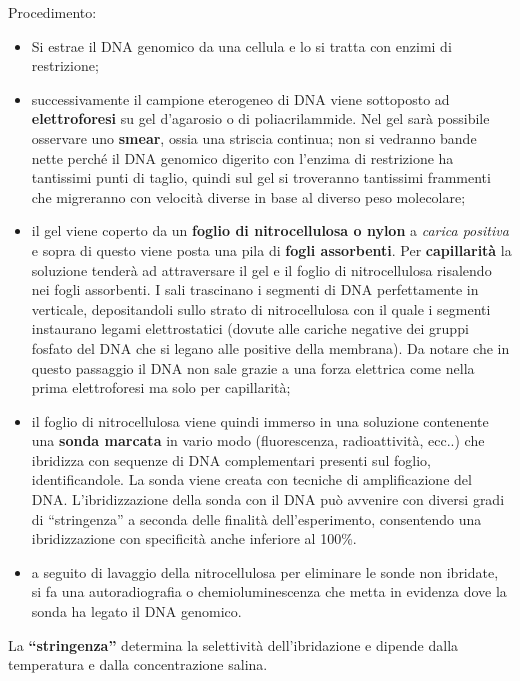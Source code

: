 \documentclass[]{article}
\begin{document}
Procedimento:

\begin{itemize}
\itemsep1pt\parskip0pt
\item
  Si estrae il DNA genomico da una cellula e lo si tratta con enzimi di
  restrizione;
\item
  successivamente il campione eterogeneo di DNA viene sottoposto ad
  \textbf{elettroforesi} su gel d'agarosio o di poliacrilammide. Nel gel
  sarà possibile osservare uno \textbf{smear}, ossia una striscia
  continua; non si vedranno bande nette perché il DNA genomico digerito
  con l'enzima di restrizione ha tantissimi punti di taglio, quindi sul
  gel si troveranno tantissimi frammenti che migreranno con velocità
  diverse in base al diverso peso molecolare;
\item
  il gel viene coperto da un \textbf{foglio di nitrocellulosa o nylon} a
  \emph{carica positiva} e sopra di questo viene posta una pila di
  \textbf{fogli assorbenti}. Per \textbf{capillarità} la soluzione
  tenderà ad attraversare il gel e il foglio di nitrocellulosa risalendo
  nei fogli assorbenti. I sali trascinano i segmenti di DNA
  perfettamente in verticale, depositandoli sullo strato di
  nitrocellulosa con il quale i segmenti instaurano legami
  elettrostatici (dovute alle cariche negative dei gruppi fosfato del
  DNA che si legano alle positive della membrana). Da notare che in
  questo passaggio il DNA non sale grazie a una forza elettrica come
  nella prima elettroforesi ma solo per capillarità;
\item
  il foglio di nitrocellulosa viene quindi immerso in una soluzione
  contenente una \textbf{sonda marcata} in vario modo (fluorescenza,
  radioattività, ecc..) che ibridizza con sequenze di DNA complementari
  presenti sul foglio, identificandole. La sonda viene creata con
  tecniche di amplificazione del DNA. L'ibridizzazione della sonda con
  il DNA può avvenire con diversi gradi di ``stringenza'' a seconda
  delle finalità dell'esperimento, consentendo una ibridizzazione con
  specificità anche inferiore al 100\%.
\item
  a seguito di lavaggio della nitrocellulosa per eliminare le sonde non
  ibridate, si fa una autoradiografia o chemioluminescenza che metta in
  evidenza dove la sonda ha legato il DNA genomico.
\end{itemize}

La \textbf{``stringenza''} determina la selettività dell'ibridazione e
dipende dalla temperatura e dalla concentrazione salina.
\end{document}
